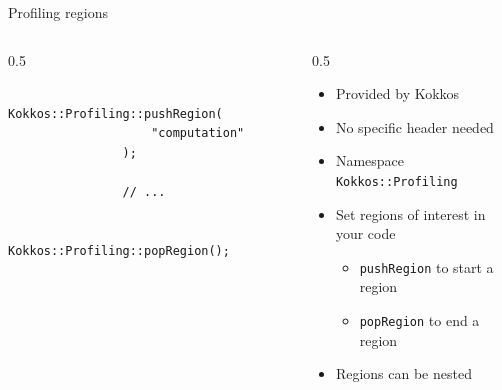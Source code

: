 \documentclass[
    aspectratio=169,
    \createHandout
]{beamer}
\begin{document}
\begin{frame}[fragile]{Profiling regions}
    \begin{columns}
        \begin{column}{0.5\linewidth}
            \begin{verbatim}
                Kokkos::Profiling::pushRegion(
                    "computation"
                );

                // ...

                Kokkos::Profiling::popRegion();
            \end{verbatim}
        \end{column}
        \begin{column}{0.5\linewidth}
            \begin{itemize}
                \item Provided by Kokkos
                \item No specific header needed
                \item Namespace \texttt{Kokkos::Profiling}
                \item Set regions of interest in your code
                \begin{itemize}
                    \item \texttt{pushRegion} to start a region
                    \item \texttt{popRegion} to end a region
                \end{itemize}
                \item Regions can be nested
            \end{itemize}
        \end{column}
    \end{columns}
\end{frame}
\end{document}
